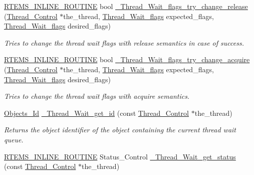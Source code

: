 \begin{DoxyCompactItemize}
\mbox{\hyperlink{group__RTEMSScoreBaseDefs_gac216239df231d5dbd15e3520b0b9313f}{R\+T\+E\+M\+S\+\_\+\+I\+N\+L\+I\+N\+E\+\_\+\+R\+O\+U\+T\+I\+NE}} bool \mbox{\hyperlink{group__RTEMSScoreThread_gac2c1e8a25615d5aa88b5029feb8d1a55}{\+\_\+\+Thread\+\_\+\+Wait\+\_\+flags\+\_\+try\+\_\+change\+\_\+release}} (\mbox{\hyperlink{struct__Thread__Control}{Thread\+\_\+\+Control}} $\ast$the\+\_\+thread, \mbox{\hyperlink{group__RTEMSScoreThread_ga9a047ae9c77bc90a258203d4f2cc57db}{Thread\+\_\+\+Wait\+\_\+flags}} expected\+\_\+flags, \mbox{\hyperlink{group__RTEMSScoreThread_ga9a047ae9c77bc90a258203d4f2cc57db}{Thread\+\_\+\+Wait\+\_\+flags}} desired\+\_\+flags)
\begin{DoxyCompactList}\small\item\em Tries to change the thread wait flags with release semantics in case of success. \end{DoxyCompactList}\item 
\mbox{\hyperlink{group__RTEMSScoreBaseDefs_gac216239df231d5dbd15e3520b0b9313f}{R\+T\+E\+M\+S\+\_\+\+I\+N\+L\+I\+N\+E\+\_\+\+R\+O\+U\+T\+I\+NE}} bool \mbox{\hyperlink{group__RTEMSScoreThread_gae67314f8bf6da8f2a14b59fcbe275a5b}{\+\_\+\+Thread\+\_\+\+Wait\+\_\+flags\+\_\+try\+\_\+change\+\_\+acquire}} (\mbox{\hyperlink{struct__Thread__Control}{Thread\+\_\+\+Control}} $\ast$the\+\_\+thread, \mbox{\hyperlink{group__RTEMSScoreThread_ga9a047ae9c77bc90a258203d4f2cc57db}{Thread\+\_\+\+Wait\+\_\+flags}} expected\+\_\+flags, \mbox{\hyperlink{group__RTEMSScoreThread_ga9a047ae9c77bc90a258203d4f2cc57db}{Thread\+\_\+\+Wait\+\_\+flags}} desired\+\_\+flags)
\begin{DoxyCompactList}\small\item\em Tries to change the thread wait flags with acquire semantics. \end{DoxyCompactList}\item 
\mbox{\hyperlink{group__RTEMSScoreObject_ga5821f52a51072941bdd603e542d0863e}{Objects\+\_\+\+Id}} \mbox{\hyperlink{group__RTEMSScoreThread_gad6328ea18c90d27d612b075965e88c03}{\+\_\+\+Thread\+\_\+\+Wait\+\_\+get\+\_\+id}} (const \mbox{\hyperlink{struct__Thread__Control}{Thread\+\_\+\+Control}} $\ast$the\+\_\+thread)
\begin{DoxyCompactList}\small\item\em Returns the object identifier of the object containing the current thread wait queue. \end{DoxyCompactList}\item 
\mbox{\hyperlink{group__RTEMSScoreBaseDefs_gac216239df231d5dbd15e3520b0b9313f}{R\+T\+E\+M\+S\+\_\+\+I\+N\+L\+I\+N\+E\+\_\+\+R\+O\+U\+T\+I\+NE}} Status\+\_\+\+Control \mbox{\hyperlink{group__RTEMSScoreThread_ga1a8eb44ff0357020e3bc2972747cd8fb}{\+\_\+\+Thread\+\_\+\+Wait\+\_\+get\+\_\+status}} (const \mbox{\hyperlink{struct__Thread__Control}{Thread\+\_\+\+Control}} $\ast$the\+\_\+thread)

\end{DoxyCompactItemize}
